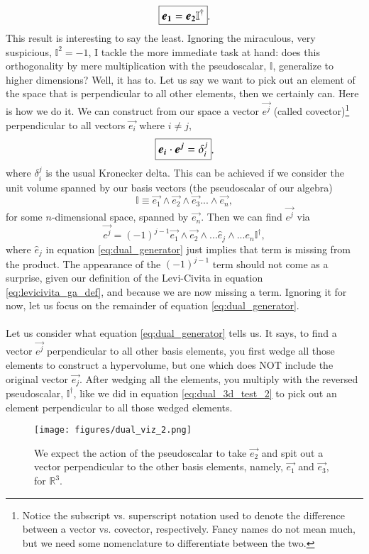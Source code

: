 \begin{equation} \label{eq:dual_3d_test_2}
\large\boxed{\vec{e_1} = \vec{e_2} \mathbb{I}^\dagger}.
\end{equation}
This result is interesting to say the least. Ignoring the miraculous, very suspicious, $\mathbb{I}^2 = -1$, I tackle the more immediate task at hand: does this orthogonality by mere multiplication with the pseudoscalar, $\mathbb{I}$, generalize to higher dimensions? Well, it has to. Let us say we want to pick out an element of the space that is perpendicular to all other elements, then we certainly can. Here is how we do it. We can construct from our space a vector $\vec{e^j}$ (called covector)\footnote{Notice the subscript vs. superscript notation used to denote the difference between a vector vs. covector, respectively. Fancy names do not mean much, but we need some nomenclature to differentiate between the two.} perpendicular to all vectors $\vec{e_i}$ where $i \neq j$,
\begin{equation} \label{eq:duality_definition}
    \large\boxed{\vec{e_i} \cdot \vec{e^j} = \delta_i^j},
\end{equation}
 where $ \delta_i^j$ is the usual Kronecker delta. This can be achieved if we consider the unit volume spanned by our basis vectors (the pseudoscalar of our algebra) 
\begin{equation}
    \mathbb{I} \equiv \vec{e_1} \wedge \vec{e_2} \wedge \vec{e_3} ... \wedge \vec{e_n},
\end{equation}
for some $n$-dimensional space, spanned by $\vec{e_n}$. Then we can find $\vec{e^j}$ via
\begin{equation}
    \label{eq:dual_generator}
    \vec{e^j} = (-1)^{j-1} \vec{e_1} \wedge \vec{e_2} \wedge ... \hat{e}_j \wedge ... e_{n} \mathbb{I}^\dagger,
\end{equation}
where $\hat{e}_j$ in equation \eqref{eq:dual_generator} just implies that term is missing from the product. The appearance of the $(-1)^{j-1}$ term should not come as a surprise, given our definition of the Levi-Civita in equation \eqref{eq:levicivita_ga_def}, and because we are now missing a term. Ignoring it for now, let us focus on the remainder of equation \eqref{eq:dual_generator}. 
\\ \\ 
Let us consider what equation \eqref{eq:dual_generator} tells us. It says, to find a vector $\vec{e^j}$ perpendicular to all other basis elements, you first wedge all those elements to construct a hypervolume, but one which does NOT include the original vector $\vec{e_j}$. After wedging all the elements, you multiply with the reversed pseudoscalar, $\mathbb{I}^\dagger$, like we did in equation \eqref{eq:dual_3d_test_2} to pick out an element perpendicular to all those wedged elements. 
\begin{figure}[H]
    \centering
    \texttt{[image: figures/dual\_viz\_2.png]}
    \caption{We expect the action of the pseudoscalar to take $\vec{e_2}$ and spit out a vector perpendicular to the other basis elements, namely, $\vec{e_1}$ and $\vec{e_3}$, for $\mathbb{R}^3$.  }
    \label{fig:dual}
\end{figure}

